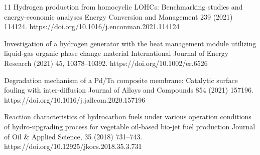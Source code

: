 \begin{publist}{11}
    {Hydrogen production from homocyclic LOHCs: Benchmarking studies and energy-economic
     analyses}
    {Energy Conversion and Management}{ 239 (2021) 114124.}
    {https://doi.org/10.1016/j.enconman.2021.114124}

    {Investigation of a hydrogen generator with the heat management module utilizing
     liquid-gas organic phase change material}
    {International Journal of Energy Research}{ (2021) 45, 10378--10392.}
    {https://doi.org/10.1002/er.6526}

    {Degradation mechanism of a Pd/Ta composite membrane: Catalytic surface fouling with
     inter-diffusion}
    {Journal of Alloys and Compounds}{ 854 (2021) 157196.}
    {https://doi.org/10.1016/j.jallcom.2020.157196}

    {Reaction characteristics of hydrocarbon fuels under various operation conditions of
     hydro-upgrading process for vegetable oil-based bio-jet fuel production}
    {Journal of Oil \& Applied Science}{, 35 (2018) 731--743.}
    {https://doi.org/10.12925/jkocs.2018.35.3.731}

\end{publist}

